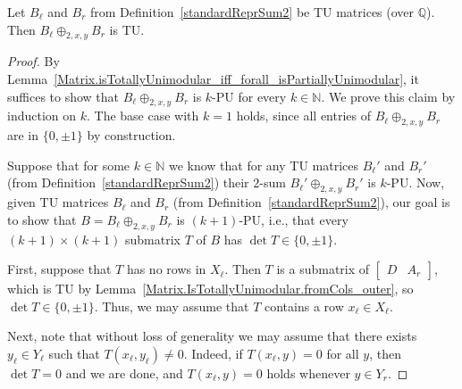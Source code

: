 \begin{lemma}
    \label{standardReprSum2_isTotallyUnimodular}
    \leanok
    Let $B_{\ell}$ and $B_{r}$ from Definition~\ref{standardReprSum2} be TU matrices (over $\mathbb{Q}$). Then $B_{\ell} \oplus_{2, x, y} B_{r}$ is TU.
\end{lemma}

\begin{proof}
    \leanok
    By Lemma~\ref{Matrix.isTotallyUnimodular_iff_forall_isPartiallyUnimodular}, it suffices to show that $B_{\ell} \oplus_{2, x, y} B_{r}$ is $k$-PU for every $k \in \mathbb{N}$. We prove this claim by induction on $k$. The base case with $k = 1$ holds, since all entries of $B_{\ell} \oplus_{2, x, y} B_{r}$ are in $\{0, \pm 1\}$ by construction.

    Suppose that for some $k \in \mathbb{N}$ we know that for any TU matrices $B_{\ell}'$ and $B_{r}'$ (from Definition~\ref{standardReprSum2}) their $2$-sum $B_{\ell}' \oplus_{2, x, y} B_{r}'$ is $k$-PU. Now, given TU matrices $B_{\ell}$ and $B_{r}$ (from Definition~\ref{standardReprSum2}), our goal is to show that $B = B_{\ell} \oplus_{2, x, y} B_{r}$ is $(k + 1)$-PU, i.e., that every $(k + 1) \times (k + 1)$ submatrix $T$ of $B$ has $\det T \in \{0, \pm 1\}$.

    First, suppose that $T$ has no rows in $X_{\ell}$. Then $T$ is a submatrix of $\begin{bmatrix} D & A_{r} \end{bmatrix}$, which is TU by Lemma~\ref{Matrix.IsTotallyUnimodular.fromCols_outer}, so $\det T \in \{0, \pm 1\}$. Thus, we may assume that $T$ contains a row $x_{\ell} \in X_{\ell}$.

    Next, note that without loss of generality we may assume that there exists $y_{\ell} \in Y_{\ell}$ such that $T (x_{\ell}, y_{\ell}) \neq 0$. Indeed, if $T (x_{\ell}, y) = 0$ for all $y$, then $\det T = 0$ and we are done, and $T (x_{\ell}, y) = 0$ holds whenever $y \in Y_{r}$.


\end{proof}
